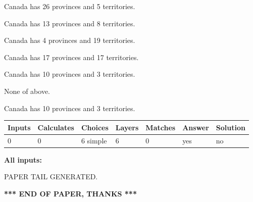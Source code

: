 \documentclass[12pt]{article}
\begin{document}
 
Canada has  26 provinces and  5 territories.
 
 
Canada has  13 provinces and  8 territories.
 
 
Canada has   4 provinces and  19 territories.
 
 
Canada has  17 provinces and  17 territories.
 
 
Canada has 10  provinces and 3 territories.
 
 
 None of above.
 
 
\noindent{}
 
 
Canada has 10  provinces and 3 territories.
 
 
\noindent{}
 
 
   
   
   
   
\noindent\begin{tabular}{|l|l|l|l|l|l|l|}
 \hline
Inputs & Calculates & Choices & Layers & Matches & Answer & Solution \\ \hline
 0  & 
 0  & 
 6
  simple  
  & 
 6  & 
 0  & 
  yes & 
  no 
  \\ \hline
 \end{tabular}
   
   
   
   
\noindent{}
   
   
   
   
\noindent\vspace{0.1in}\hspace{-0.08in} {\textbf{\Large{All inputs: }}}
   
   
   
   
   
   
 \vspace{0.2in}
 
   
   
\vspace{2.0in} PAPER TAIL GENERATED.
   
   
   
   
\vspace{1.0in} 
{\textbf{\large{ *** END OF PAPER, THANKS *** }}} 
   
\end{document}
